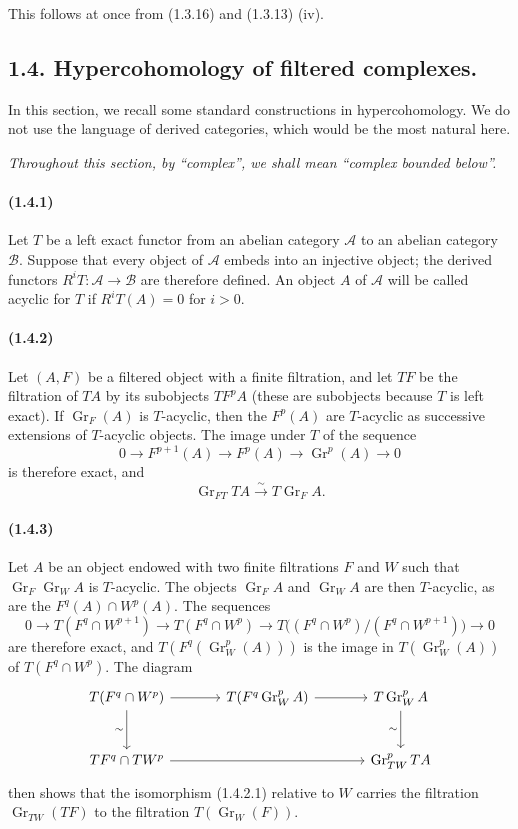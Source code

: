 \documentclass[10pt]{article}
\newcommand{\Gr}{\operatorname{Gr}}
\newcommand{\calA}{\mathcal A}
\newcommand{\calB}{\mathcal B}
\newcommand{\iso}{\xrightarrow{\sim}}
\begin{document}
This follows at once from (1.3.16) and (1.3.13) (iv).

\subsection*{1.4. Hypercohomology of filtered complexes.}

In this section, we recall some standard constructions in hypercohomology. We do not use the language of derived categories, which would be the most natural here.

\emph{Throughout this section, by “complex”, we shall mean “complex bounded below”.}

\paragraph{(1.4.1)} Let $T$ be a left exact functor from an abelian category $\calA$ to an abelian category $\calB$. Suppose that every object of $\calA$ embeds into an injective object; the derived functors $R^iT:\calA\to\calB$ are therefore defined. An object $A$ of $\calA$ will be called acyclic for $T$ if $R^iT(A)=0$ for $i>0$.

\paragraph{(1.4.2)} Let $(A,F)$ be a filtered object with a finite filtration, and let $TF$ be the filtration of $TA$ by its subobjects $TF^pA$ (these are subobjects because $T$ is left exact). If $\Gr_F(A)$ is $T$-acyclic, then the $F^p(A)$ are $T$-acyclic as successive extensions of $T$-acyclic objects. The image under $T$ of the sequence
\[
0\to F^{p+1}(A)\to F^p(A)\to\Gr^p(A)\to0
\]
is therefore exact, and
\[
\tag{1.4.2.1}
\Gr_{FT}TA\iso T\Gr_FA.
\]

\paragraph{(1.4.3)} Let $A$ be an object endowed with two finite filtrations $F$ and $W$ such that $\Gr_F\Gr_WA$ is $T$-acyclic. The objects $\Gr_FA$ and $\Gr_WA$ are then $T$-acyclic, as are the $F^q(A)\cap W^p(A)$. The sequences
\[
0\to T(F^q\cap W^{p+1})\to T(F^q\cap W^p)\to T\bigl((F^q\cap W^p)/(F^q\cap W^{p+1})\bigr)\to0
\]
are therefore exact, and $T(F^q(\Gr_W^p(A)))$ is the image in $T(\Gr_W^p(A))$ of $T(F^q\cap W^p)$. The diagram
\[
\begin{tikzcd}[column sep=large,row sep=large]
T(F^q\cap W^p) \arrow[r] \arrow[d,"\sim"'] & T(F^q\Gr_W^pA) \arrow[r] & T\Gr_W^pA \arrow[d,"\sim"']\\
TF^q\cap TW^p \arrow[rr] && \Gr_{TW}^pTA
\end{tikzcd}
\]
then shows that the isomorphism (1.4.2.1) relative to $W$ carries the filtration $\Gr_{TW}(TF)$ to the filtration $T(\Gr_W(F))$.
\end{document}
